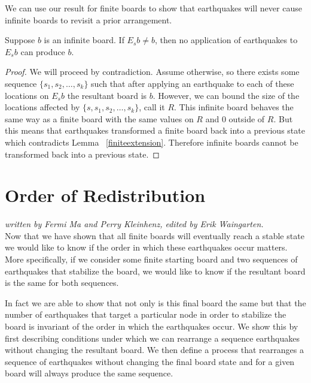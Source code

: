 \documentclass[runningheads,a4paper]{llncs}
\begin{document}
We can use our result for finite boards to show that earthquakes will never cause infinite boards to revisit a prior arrangement.  

\begin{corollary}
Suppose $b$ is an infinite board. If $E_s b \neq b$, then no application of earthquakes to $E_s b$ can produce $b$.
\end{corollary}

\begin{proof}
We will proceed by contradiction. Assume otherwise, so there exists some sequence $\{s_1, s_2, \ldots, s_k\}$ such that after applying an earthquake to each of these locations on $E_s b$ the resultant board is $b$.
However, we can bound the size of the locations affected by $\{s, s_1, s_2, \ldots, s_k \}$, call it $R$.  This infinite board behaves the same way as a finite board with the same values on $R$ and 0 outside of $R$. But this means that earthquakes transformed a finite board back into a previous state which contradicts Lemma ~\ref{finiteextension}. Therefore infinite boards cannot be transformed back into a previous state.
\end{proof}

\section{Order of Redistribution}
\label{Order of Redistribution}

\emph{written by Fermi Ma and Perry Kleinhenz, edited by Erik Waingarten.}\\

Now that we have shown that all finite boards will eventually reach a stable state we would like to know if the order in which these earthquakes occur matters. More specifically, if we consider some finite starting board and two sequences of earthquakes that stabilize the board, we would like to know if the resultant board is the same for both sequences. 

In fact we are able to show that not only is this final board the same but that the number of earthquakes that target a particular node in order to stabilize the board is invariant of the order in which the earthquakes occur. We show this by first describing conditions under which we can rearrange a sequence earthquakes without changing the resultant board. We then define a process that rearranges a sequence of earthquakes without changing the final board state and for a given board will always produce the same sequence.\\
\end{document}
